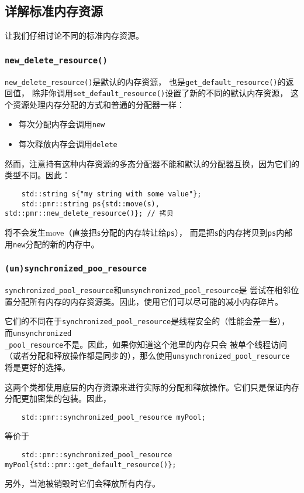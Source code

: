 \subsection{详解标准内存资源}
让我们仔细讨论不同的标准内存资源。

\subsubsection{\texttt{new\_delete\_resource()}}
\texttt{new\_delete\_resource()}是默认的内存资源，
也是\texttt{get\_default\_resource()}的返回值，
除非你调用\texttt{set\_default\_resource()}设置了新的不同的默认内存资源，
这个资源处理内存分配的方式和普通的分配器一样：
\begin{itemize}
    \item 每次分配内存会调用\texttt{new}
    \item 每次释放内存会调用\texttt{delete}
\end{itemize}
然而，注意持有这种内存资源的多态分配器不能和默认的分配器互换，因为它们的类型不同。因此：
\begin{lstlisting}
    std::string s{"my string with some value"};
    std::pmr::string ps{std::move(s), std::pmr::new_delete_resource()}; // 拷贝
\end{lstlisting}
将不会发生move（直接把\texttt{s}分配的内存转让给\texttt{ps}），
而是把\texttt{s}的内存拷贝到\texttt{ps}内部用\texttt{new}分配的新的内存中。

\subsubsection{\texttt{(un)synchronized\_poo\_resource}}
\texttt{synchronized\_pool\_resource}和\texttt{unsynchronized\_pool\_resource}是
尝试在相邻位置分配所有内存的内存资源类。因此，使用它们可以尽可能的减小内存碎片。

它们的不同在于\texttt{synchronized\_pool\_resource}是线程安全的（性能会差一些），
而\texttt{unsynchronized\\
\_pool\_resource}不是。因此，如果你知道这个池里的内存只会
被单个线程访问（或者分配和释放操作都是同步的），那么使用\texttt{unsynchronized\_pool\_resource}
将是更好的选择。

这两个类都使用底层的内存资源来进行实际的分配和释放操作。它们只是保证内存分配更加密集的包装。因此，
\begin{lstlisting}
    std::pmr::synchronized_pool_resource myPool;
\end{lstlisting}
等价于
\begin{lstlisting}
    std::pmr::synchronized_pool_resource myPool{std::pmr::get_default_resource()};
\end{lstlisting}
另外，当池被销毁时它们会释放所有内存。

